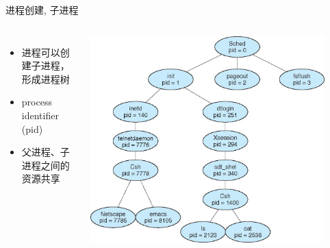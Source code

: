 \documentclass[xcolor=svgnames]{beamer}
\begin{document}
\begin{CJK*}{UTF8}{gbsn}
\begin{frame}{进程创建, 子进程}
\begin{columns}%
\begin{itemize}
\item 进程可以创建子进程，形成进程树
\item process identifier (pid)
\item 父进程、子进程之间的资源共享
\end{itemize}
\includegraphics[width=0.9\textwidth]{tree.jpg}
\end{columns}%
\end{frame}

\end{CJK*}
\end{document}

